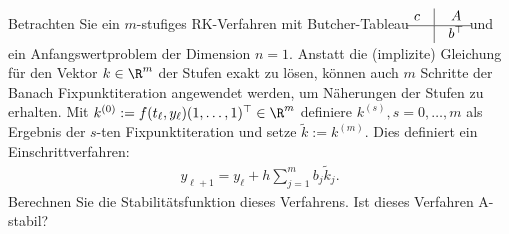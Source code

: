 \begin{exercise}
Betrachten Sie ein $m$-stufiges RK-Verfahren mit Butcher-Tableau
$\begin{matrix}
  c & \vline & A \\ \hline & \vline & b^{\top}
\end{matrix}$ und ein Anfangswertproblem der Dimension $n = 1$.
Anstatt die (implizite) Gleichung für den Vektor $k \in \R^m$ der Stufen exakt
zu lösen, können auch $m$ Schritte der Banach Fixpunktiteration angewendet werden,
um Näherungen der Stufen zu erhalten. Mit $k^{(0)} := f(t_{\ell},y_{\ell})(1,\dots,1)^{\top} \in \R^m$
definiere $k^{(s)}, s = 0,\dots,m$ als Ergebnis der $s$-ten Fixpunktiteration und setze
$\widetilde{k} := k^{(m)}$. Dies definiert ein Einschrittverfahren:
\begin{align*}
  y_{\ell + 1} = y_{\ell} + h\sum_{j = 1}^m b_j \widetilde{k}_j.
\end{align*}
Berechnen Sie die Stabilitätsfunktion dieses Verfahrens. Ist dieses Verfahren
A-stabil?
\end{exercise}
